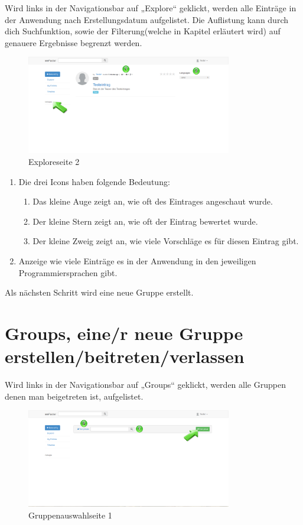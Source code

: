 Wird links in der Navigationsbar auf „Explore“ geklickt, werden alle Einträge in der Anwendung nach Erstellungsdatum aufgelistet. Die Auflistung kann durch dich Suchfunktion, sowie der Filterung(welche in Kapitel erläutert wird) auf genauere Ergebnisse begrenzt werden.

\begin{figure}[H]
    \centering
    \includegraphics[width=0.8\textwidth]{Bilder/16.png}
    \caption{Exploreseite 2 }
    \label{fig:exploreseite2}
\end{figure}



\begin{enumerate}
\item Die drei Icons haben folgende Bedeutung:
\begin{enumerate}
\item Das kleine Auge zeigt an, wie oft des Eintrages angeschaut wurde.
\item Der kleine Stern zeigt an, wie oft der Eintrag bewertet wurde.
\item Der kleine Zweig zeigt an, wie viele Vorschläge es für diesen Eintrag gibt.
\end{enumerate}
\item Anzeige wie viele Einträge es in der Anwendung in den jeweiligen Programmiersprachen gibt.

\end{enumerate}


Als nächsten Schritt wird eine neue Gruppe erstellt.


\chapter{Groups, eine/r neue Gruppe erstellen/beitreten/verlassen}

Wird links in der Navigationsbar auf „Groups“ geklickt, werden alle Gruppen denen man beigetreten ist, aufgelistet.

\begin{figure}[H]
    \centering
    \includegraphics[width=0.8\textwidth]{Bilder/17.png}
    \caption{Gruppenauswahlseite 1 }
    \label{fig:gruppenauswahlseite 1}
\end{figure}


